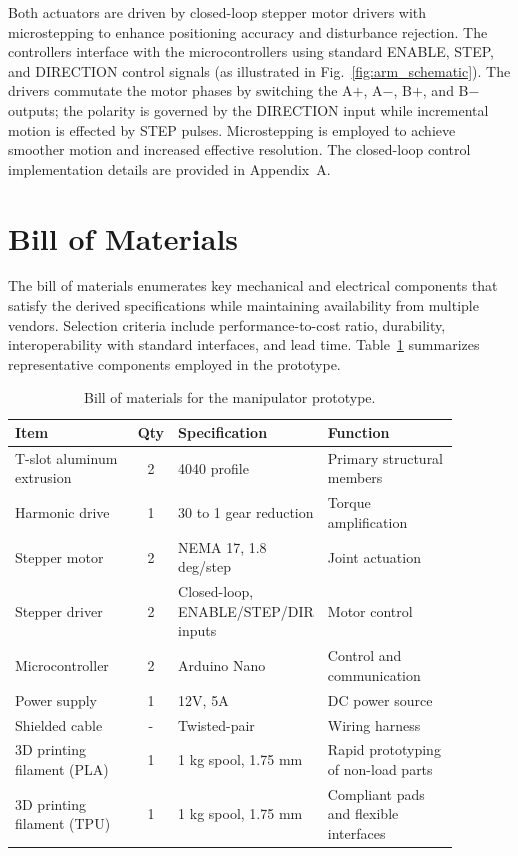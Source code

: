Both actuators are driven by closed-loop stepper motor drivers with microstepping to enhance positioning accuracy and disturbance rejection. The controllers 
interface with the microcontrollers using standard ENABLE, STEP, and DIRECTION control signals (as illustrated in Fig.~\ref{fig:arm_schematic}). The 
drivers commutate the motor phases by switching the A$+$, A$-$, B$+$, and B$-$ outputs; the polarity is governed by the DIRECTION input while 
incremental motion is effected by STEP pulses. Microstepping is employed to achieve smoother motion and increased effective resolution. The closed-loop 
control implementation details are provided in Appendix~A.


\section{Bill of Materials}

The bill of materials enumerates key mechanical and electrical components that satisfy the derived specifications while maintaining
 availability from multiple vendors. Selection criteria include performance-to-cost ratio, durability, interoperability with standard 
 interfaces, and lead time. Table~\ref{tab:components_bom} summarizes representative components employed in the prototype.

\begin{table}[H]
\centering
\caption{Bill of materials for the manipulator prototype.}
\label{tab:components_bom}
\begin{tabular}{|p{0.28\linewidth}|c|p{0.30\linewidth}|p{0.30\linewidth}|}
\hline
Item & Qty & Specification & Function \\
\hline
T-slot aluminum extrusion & 2 & 4040 profile & Primary structural members \\
Harmonic drive & 1 & 30 to 1 gear reduction & Torque amplification \\
Stepper motor & 2 & NEMA 17, 1.8 deg/step & Joint actuation \\
Stepper driver & 2 & Closed-loop, ENABLE/STEP/DIR inputs & Motor control \\
Microcontroller & 2 & Arduino Nano & Control and communication \\
Power supply & 1 & 12V, 5A & DC power source \\
Shielded cable & - & Twisted-pair & Wiring harness \\
3D printing filament (PLA) & 1 & 1 kg spool, 1.75 mm & Rapid prototyping of non-load parts \\
3D printing filament (TPU) & 1 & 1 kg spool, 1.75 mm & Compliant pads and flexible interfaces \\
\hline
\end{tabular}
\end{table}


